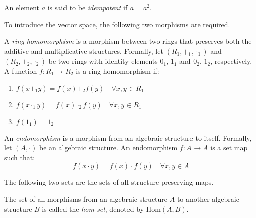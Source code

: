 \documentclass[
	11pt, %
	fleqn, %
	a4paper, %
]{LegrandOrangeBook}
\newcommand{\Hom}[2]{\text{Hom}(#1, #2)} %
\begin{document}
\begin{definition}
    An element $a$ is said to be \emph{idempotent} if $a = a^2$.
\end{definition}

\newpage

To introduce the vector space, the following two morphisms are required.

\begin{definition}
    A \emph{ring homomorphism} is a morphism between two rings that preserves both the additive and multiplicative structures. Formally, let $(R_1, +_1, \cdot_1)$ and $(R_2, +_2, \cdot_2)$ be two rings with identity elements $0_1$, $1_1$ and $0_2$, $1_2$, respectively. A function $f: R_1 \to R_2$ is a ring homomorphism if:
    \begin{enumerate}
        \item $f(x +_1 y) = f(x) +_2 f(y) \quad \forall x, y \in R_1$
        \item $f(x \cdot_1 y) = f(x) \cdot_2 f(y) \quad \forall x, y \in R_1$
        \item $f(1_1) = 1_2$
    \end{enumerate}    
\end{definition}

\begin{definition}[Endomorphism]
    An \emph{endomorphism} is a morphism from an algebraic structure to itself. Formally, let $(A, \cdot)$ be an algebraic structure. An endomorphism $f: A \to A$ is a set map such that:
    \[
        f(x \cdot y) = f(x) \cdot f(y) \quad \forall x, y \in A
    \]
\end{definition}

The following two sets are the sets of all structure-preserving maps.

\begin{definition}
    The set of all morphisms from an algebraic structure $A$ to another algebraic structure $B$ is called the \emph{hom-set}, denoted by $\Hom{A}{B}$. 
\end{definition}
\end{document}
